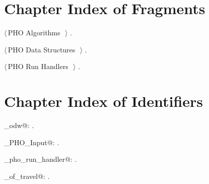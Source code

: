 \documentclass[10.0pt]{report}
\begin{document}
\section{Chapter Index of Fragments}

{\small\begin{list}{}{\setlength{\itemsep}{-\parsep}\setlength{\itemindent}{-\leftmargin}}
\item $\langle\,$PHO Algorithms\nobreak\ {\footnotesize {}}$\,\rangle$ {\footnotesize {\NWtxtRefIn} .}
\item $\langle\,$PHO Data Structures\nobreak\ {\footnotesize {}}$\,\rangle$ {\footnotesize {\NWtxtRefIn} .}
\item $\langle\,$PHO Run Handlers\nobreak\ {\footnotesize {}}$\,\rangle$ {\footnotesize {\NWtxtRefIn} .}
\end{list}}
\section{Chapter Index of Identifiers}

{\small\begin{list}{}{\setlength{\itemsep}{-\parsep}\setlength{\itemindent}{-\leftmargin}}
\item \verb@algo_odw@: \underline{}.
\item \verb@Single_PHO_Input@: \underline{}.
\item \verb@single_pho_run_handler@: \underline{}.
\item \verb@time_of_travel@: \underline{}.
\end{list}} 
\nocite{*} %
 

\end{document}
